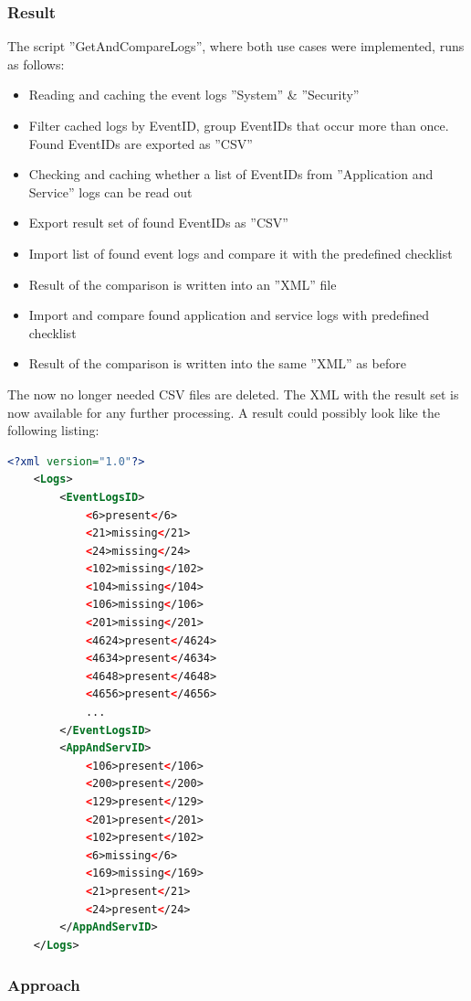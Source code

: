 \subsubsection{Result} \label{ResultSetGetAndCompareLogs}
The script ''GetAndCompareLogs'', where both use cases were implemented, runs as follows:
\begin{itemize}
    \item Reading and caching the event logs ''System'' \& ''Security''
    \item Filter cached logs by EventID, group EventIDs that occur more than once. Found EventIDs are exported as ''CSV''
    \item Checking and caching whether a list of EventIDs from ''Application and Service'' logs can be read out
    \item Export result set of found EventIDs as ''CSV''
    \item Import list of found event logs and compare it with the predefined checklist
    \item Result of the comparison is written into an ''XML'' file
    \item Import and compare found application and service logs with predefined checklist
    \item Result of the comparison is written into the same ''XML'' as before
\end{itemize}
The now no longer needed CSV files are deleted. The XML with the result set is now available for any further processing.  A result could possibly look like the following listing:
\begin{lstlisting}[caption=Example Result Audit Policy Analysis, language=xml]
    <?xml version="1.0"?>
    <Logs>
        <EventLogsID>
            <6>present</6>
            <21>missing</21>
            <24>missing</24>
            <102>missing</102>
            <104>missing</104>
            <106>missing</106>
            <201>missing</201>
            <4624>present</4624>
            <4634>present</4634>
            <4648>present</4648>
            <4656>present</4656>
            ...
        </EventLogsID>
        <AppAndServID>
            <106>present</106>
            <200>present</200>
            <129>present</129>
            <201>present</201>
            <102>present</102>
            <6>missing</6>
            <169>missing</169>
            <21>present</21>
            <24>present</24>
        </AppAndServID>
    </Logs>
\end{lstlisting}


\subsubsection{Approach}
